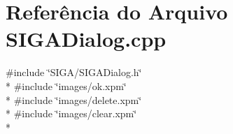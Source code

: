 \section{Referência do Arquivo S\+I\+G\+A\+Dialog.\+cpp}
\label{_s_i_g_a_dialog_8cpp}
{\ttfamily \#include \char`\"{}S\+I\+G\+A/\+S\+I\+G\+A\+Dialog.\+h\char`\"{}}\\*
{\ttfamily \#include \char`\"{}images/ok.\+xpm\char`\"{}}\\*
{\ttfamily \#include \char`\"{}images/delete.\+xpm\char`\"{}}\\*
{\ttfamily \#include \char`\"{}images/clear.\+xpm\char`\"{}}\\*
